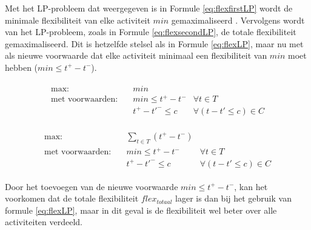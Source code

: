 Met het LP-probleem dat weergegeven is in Formule \ref{eq:flexfirstLP} wordt de minimale flexibiliteit van elke activiteit $min$ gemaximaliseerd \cite{wilmer13}. Vervolgens wordt van het LP-probleem, zoals in Formule \ref{eq:flexsecondLP}, de totale flexibiliteit gemaximaliseerd. Dit is hetzelfde stelsel als in Formule \ref{eq:flexLP}, maar nu met als nieuwe voorwaarde dat elke activiteit minimaal een flexibiliteit van $min$ moet hebben ($min \leq t^+ - t^ -$).

\begin{align}
\label{eq:flexfirstLP}
\begin{aligned}
        \text{max:}& \quad min & \\
 \text{met voorwaarden:}& \quad min \leq t^+ - t^- & \forall t \in T \\
                   & \quad t^+ - t'^- \leq c & \forall (t - t' \leq c) \in C
\end{aligned}
\end{align}

\begin{align}
\label{eq:flexsecondLP}
\begin{aligned}
        \text{max:}& \quad \sum_{t \in T} (t^+ - t^-) & \\
 \text{met voorwaarden:}& \quad min \leq t^+ - t^- & \forall t \in T \\
                   & \quad t^+ - t'^- \leq c & \forall (t - t' \leq c) \in C
\end{aligned}
\end{align}

Door het toevoegen van de nieuwe voorwaarde $min \leq t^+ - t^-$, kan het voorkomen dat de totale flexibiliteit $flex_{totaal}$ lager is dan bij het gebruik van formule \ref{eq:flexLP}, maar in dit geval is de flexibiliteit wel beter over alle activiteiten verdeeld.
